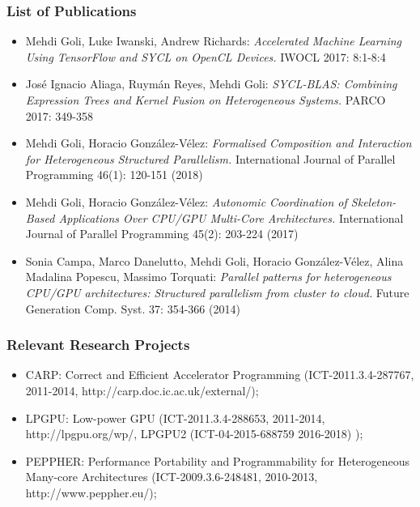\documentclass[a4paper,11pt]{article}
\begin{document}
\subsubsection*{List of Publications}

\begin{itemize}

\item Mehdi Goli, Luke Iwanski, Andrew Richards:
\textit{Accelerated Machine Learning Using TensorFlow and SYCL on OpenCL Devices.} IWOCL 2017: 8:1-8:4
\item José Ignacio Aliaga, Ruymán Reyes, Mehdi Goli:
\textit{SYCL-BLAS: Combining Expression Trees and Kernel Fusion on Heterogeneous Systems.} PARCO 2017: 349-358
\item Mehdi Goli, Horacio González-Vélez:
\textit{Formalised Composition and Interaction for Heterogeneous Structured Parallelism.} International Journal of Parallel Programming 46(1): 120-151 (2018)

\item Mehdi Goli, Horacio González-Vélez:
\textit{Autonomic Coordination of Skeleton-Based Applications Over CPU/GPU Multi-Core Architectures.} International Journal of Parallel Programming 45(2): 203-224 (2017)


\item Sonia Campa, Marco Danelutto, Mehdi Goli, Horacio González-Vélez, Alina Madalina Popescu, Massimo Torquati:
\textit{ Parallel patterns for heterogeneous CPU/GPU architectures: Structured parallelism from cluster to cloud.} Future Generation Comp. Syst. 37: 354-366 (2014)

\end{itemize}

\subsubsection*{Relevant Research Projects}

\begin{itemize}
\item
CARP: Correct and Efficient Accelerator Programming (ICT-2011.3.4-287767, 2011-2014, http://carp.doc.ic.ac.uk/external/);
\item
LPGPU: Low-power GPU (ICT-2011.3.4-288653,  2011-2014, http://lpgpu.org/wp/, LPGPU2 (ICT-04-2015-688759  2016-2018) );
\item
PEPPHER: Performance Portability and Programmability for Heterogeneous Many-core Architectures (ICT-2009.3.6-248481, 2010-2013, http://www.peppher.eu/);
\end{itemize}
\end{document}
